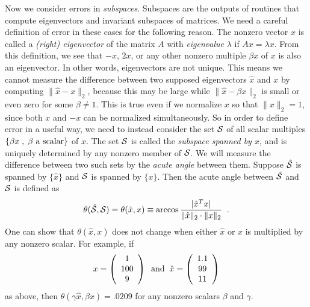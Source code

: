 Now we consider errors in {\em subspaces}. Subspaces are the
outputs of routines that compute eigenvectors and invariant
subspaces of matrices.  We need a careful definition
of error in these cases for the following reason. The nonzero vector $x$ is called a
{\em (right) eigenvector} of the matrix $A$ with {\em eigenvalue}
$\lambda$ if $Ax = \lambda x$. From this definition, we see that
$-x$, $2x$, or any other nonzero multiple $\beta x$ of $x$ is also an
eigenvector. In other words, eigenvectors are not unique. This
means we cannot measure the difference between two supposed eigenvectors
$\hat{x}$ and $x$ by computing $\| \hat{x} - x \|_2$, because this may
be large while $\| \hat{x} - \beta x \|_2$ is small or even zero for
some $\beta \neq 1$. This is true
even if we normalize $x$ so that $\|x\|_2 = 1$, since both
$x$ and $-x$ can be normalized simultaneously. So in order to define
error in a useful way, we need to instead consider the set $\cal S$ of
all scalar multiples $\{ \beta x \; , \; \beta {\rm ~a~scalar} \}$ of
$x$. The set $\cal S$ is
called the {\em subspace spanned by $x$}, and is uniquely determined
by any nonzero member of $\cal S$. We will measure the difference
between two such sets by the {\em acute angle} between them.
Suppose $\hat{\cal S}$ is spanned by $\{ \hat x \}$ and
$\cal S$ is spanned by $\{ x \}$. Then the acute angle between
$\hat{\cal S}$ and $\cal S$ is defined as
\[
\theta ( \hat{\cal S}, {\cal S} ) =
\theta ( \hat{x} , x ) \equiv \arccos
\frac{| \hat{x}^T x |}{ \| \hat{x} \|_2 \cdot \| x \|_2 } \; \; .
\]
One can show that $\theta ( \hat{x} , x )$ does not change when either
$\hat{x}$ or $x$ is multiplied by any nonzero scalar. For example, if
\[
x = \bmat{c} 1 \\ 100 \\ 9 \emat \; \; {\rm and} \; \;
\hat{x} = \bmat{c} 1.1 \\ 99 \\ 11 \emat
\]
as above, then $\theta ( \gamma \hat{x} , \beta x ) = .0209$ for any
nonzero scalars $\beta$ and $\gamma$.

